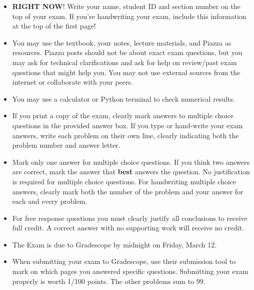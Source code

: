 \documentclass[addpoints]{exam}
\begin{document}
\begin{itemize}                        %
	\item {\bf RIGHT NOW}! Write your name, student ID and section number on the top of your exam. If you're handwriting your exam, include this information at the top of the first page!
	\item You may use the textbook, your notes, lecture materials, and Piazza as resources.  Piazza posts should not be about exact exam questions, but you may ask for technical clarifications and ask for help on review/past exam questions that might help you.  You may not use external sources from the internet or collaborate with your peers.
	\item You may use a calculator or Python terminal to check numerical results.
	\item If you print a copy of the exam, clearly mark answers to multiple choice questions in the provided answer box. If you type or hand-write your exam answers, write each problem on their own line, clearly indicating both the problem number and answer letter.
	\item Mark only one answer for multiple choice questions.  If you think two answers are correct, mark the answer that {\bf best} answers the question.  No justification is required for multiple choice questions.  For handwriting multiple choice answers, clearly mark both the number of the problem and your answer for each and every problem. 
	\item For free response questions you must clearly justify all conclusions to receive full credit.  A correct answer with no supporting work will receive no credit. 
	\item The Exam is due to Gradescope by midnight on Friday, March 12.
	\item When submitting your exam to Gradescope, use their submission tool to mark on which pages you answered specific questions.  Submitting your exam properly is worth 1/100 points.  The other problems sum to 99.
\end{itemize}
\clearpage

\end{document}
